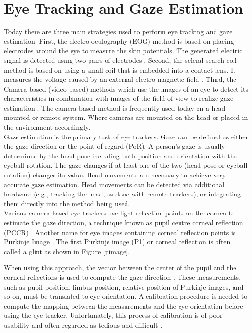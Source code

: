 \section{Eye Tracking and Gaze Estimation}

Today there are three main strategies used to perform eye tracking and gaze estimation. First, the electro-oculography (EOG) method is based on placing electrodes around the eye to measure the skin potentials. The generated electric signal is detected using two pairs of electrodes \cite{3}. Second, the scleral search coil method is based on using a small coil that is embedded into a contact lens. It measures the voltage caused by an external electro magnetic field \cite{25}. Third, the Camera-based (video based) methods which use the images of an eye to detect its characteristics in combination with images of the field of view to realize gaze estimation \cite{13}. The camera-based method is frequently used today on a head-mounted or remote system. Where cameras are mounted on the head or placed in the environment accordingly.\\

Gaze estimation is the primary task of eye trackers. Gaze can be defined as either the gaze direction or the point of regard (PoR). A person’s gaze is usually determined by the head pose including both position and orientation with the eyeball rotation. The gaze changes if at least one of the two (head pose or eyeball rotation) changes its value. Head movements are necessary to achieve very accurate gaze estimation. Head movements can be detected via additional hardware (e.g., tracking the head, as done with remote trackers), or integrating them directly into the method being used.\\

Various camera based eye trackers use light reflection points on the cornea to estimate the gaze direction, a technique known as pupil centre corneal reflection (PCCR) \cite{1}. Another name for eye images containing corneal reflection points is Purkinje Image \cite{2}. The first Purkinje image (P1) or corneal reflection is often called a glint as shown in Figure \ref{pimage}.

When using this approach, the vector between the center of the pupil and the corneal reflections is used to compute the gaze direction \cite{3}. These measurements, such as pupil position, limbus position, relative position of Purkinje images, and so on, must be translated to eye orientation. A calibration procedure is needed to compute the mapping between the measurements and the eye orientation before using the eye tracker. Unfortunately, this process of calibration is of poor usability and often regarded as tedious and difficult \cite{4}. 



